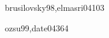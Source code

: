 \begin{syllabus}
\begin{unit}{\IMInformationStorageAndRetrievalDef}{brusilovsky98,elmasri04}{10}{3}
    \IMInformationStorageAndRetrievalAllTopics%
    \IMInformationStorageAndRetrievalAllObjectives%
\end{unit}

\begin{unit}{\IMDistributedDatabasesDef}{ozsu99,date04}{36}{4}
    \IMDistributedDatabasesAllTopics
    \IMDistributedDatabasesAllObjectives
\end{unit}



\begin{coursebibliography}
\end{coursebibliography}

\end{syllabus}

%
